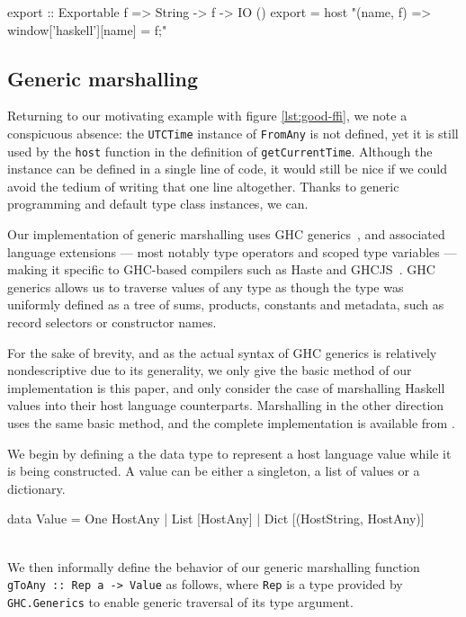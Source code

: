 \documentclass{sigplanconf}
\begin{document}
\begin{code}
  export :: Exportable f => String -> f -> IO ()
  export =
    host "(name, f) => {window['haskell'][name] = f;}"
\end{code}

\subsection{Generic marshalling}
\label{sec:default-instances}
Returning to our motivating example with figure \ref{lst:good-ffi}, we note
a conspicuous absence: the \lstinline!UTCTime! instance of \lstinline!FromAny!
is not defined, yet it is still used by the \lstinline!host! function in the
definition of \lstinline!getCurrentTime!. Although the instance can be defined
in a single line of code, it would still be nice if we could avoid the tedium
of writing that one line altogether. Thanks to generic programming and default
type class instances, we can.

Our implementation of generic marshalling uses GHC generics\ \cite{generics},
and associated language extensions --- most notably type operators and scoped
type variables --- making it specific to GHC-based compilers such as Haste and
GHCJS\ \cite{ghcjs}. GHC generics allows us to traverse values of any type
as though the type was uniformly defined as a tree of sums, products,
constants and metadata, such as record selectors or constructor names.

For the sake of brevity, and as the actual syntax of GHC generics is
relatively nondescriptive due to its generality, we only give the basic method
of our implementation is this paper, and only consider the case of marshalling
Haskell values into their host language counterparts.
Marshalling in the other direction uses the same basic method,
and the complete implementation is available from \cite{haste-lang.org}.

We begin by defining a the data type to represent a host language value while
it is being constructed. A value can be either a singleton, a list of
values or a dictionary.\\
\begin{code}
  data Value
    = One HostAny
    | List [HostAny]
    | Dict [(HostString, HostAny)]
\end{code}\\
We then informally define the behavior of our generic marshalling function
\lstinline!gToAny :: Rep a -> Value! as follows, where \lstinline!Rep! is
a type provided by \lstinline!GHC.Generics! to enable generic traversal
of its type argument.
\end{document}
